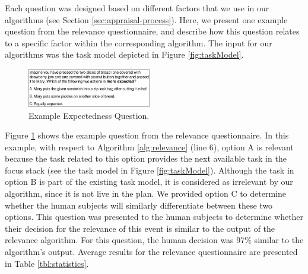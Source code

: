 \documentclass{article}
\begin{document}
Each question was designed based on different factors that we use in our
algorithms (see Section \ref{sec:appraisal-process}). Here, we present one
example question from the relevance questionnaire, and describe how this
question relates to a specific factor within the corresponding algorithm. The
input for our algorithms was the task model depicted in Figure
\ref{fig:taskModel}.

\begin{figure}[tbh]
  \vspace{-1mm}
  \centering
  \includegraphics[width=0.48\textwidth]{figure/question-sample-croped.pdf}
  \vspace*{-7mm}
  \caption{{\fontsize{9}{9}\selectfont Example Expectedness Question.}}
  \label{fig:qs1}
  \vspace{-2mm}
\end{figure}

Figure \ref{fig:qs1} shows the example question from the relevance
questionnaire. In this example, with respect to Algorithm \ref{alg:relevance}
(line 6), option A is relevant because {\color{red}the task related to this
option provides the next available task in the focus stack (see the task model in
Figure \ref{fig:taskModel}). Although the task in option B is part of the
existing task model, it is considered as irrelevant by our algorithm, since it
is not live in the plan.} We provided option C to determine whether the human
subjects will similarly differentiate between these two options. This question
was presented to the human subjects to determine whether their decision for the
relevance of this event is similar to the output of the relevance algorithm. For
this question, the human decision was {\color{red}97\%} similar to the
algorithm's output. Average results for the relevance questionnaire are
presented in Table \ref{tbl:statistics}.

% 
\end{document}
